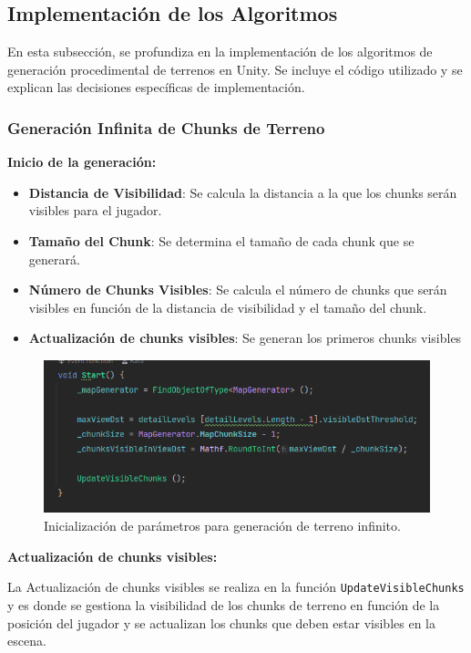 \subsection{Implementación de los Algoritmos}

En esta subsección, se profundiza en la implementación de los algoritmos de generación procedimental de terrenos en Unity. Se incluye el código utilizado y se explican las decisiones específicas de implementación.

\subsubsection{Generación Infinita de Chunks de Terreno}

\textbf{Inicio de la generación:}\label{subsec:generacion-infinita}

\begin{itemize}
    \item \textbf{Distancia de Visibilidad}: Se calcula la distancia a la que los chunks serán visibles para el jugador.
    \item \textbf{Tamaño del Chunk}: Se determina el tamaño de cada chunk que se generará.
    \item \textbf{Número de Chunks Visibles}: Se calcula el número de chunks que serán visibles en función de la distancia de visibilidad y el tamaño del chunk.
    \item \textbf{Actualización de chunks visibles}: Se generan los primeros chunks visibles
\end{itemize}
\begin{figure}[h]
    \centering
    \includegraphics[width=1\textwidth]{img/codes/EndlessTerrain-start.png}
    \caption{Inicialización de parámetros para generación de terreno infinito.}
\end{figure}

\textbf{Actualización de chunks visibles:}

La Actualización de chunks visibles se realiza en la función \texttt{UpdateVisibleChunks} y es donde se gestiona la visibilidad de los chunks de terreno en función de la posición del jugador y se actualizan los chunks que deben estar visibles en la escena.

